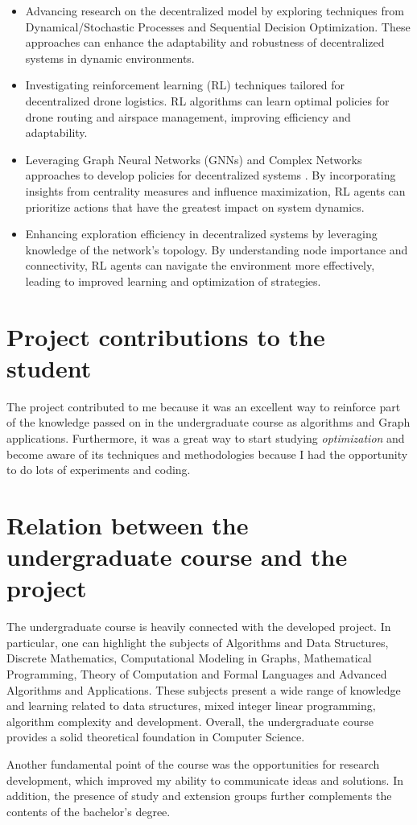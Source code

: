 \begin{itemize}
    \item Advancing research on the decentralized model by exploring techniques from Dynamical/Stochastic Processes and Sequential Decision Optimization. These approaches can enhance the adaptability and robustness of decentralized systems in dynamic environments.
    \item Investigating reinforcement learning (RL) techniques tailored for decentralized drone logistics. RL algorithms can learn optimal policies for drone routing and airspace management, improving efficiency and adaptability.
    \item Leveraging Graph Neural Networks (GNNs) and Complex Networks approaches to develop policies for decentralized systems \cite{gnn_policyXIAO2023119074}. By incorporating insights from centrality measures and influence maximization, RL agents can prioritize actions that have the greatest impact on system dynamics.
    \item Enhancing exploration efficiency in decentralized systems by leveraging knowledge of the network's topology. By understanding node importance and connectivity, RL agents can navigate the environment more effectively, leading to improved learning and optimization of strategies.
\end{itemize}

\section{Project contributions to the student}

The project contributed to me because it was an excellent way to reinforce part of the knowledge passed on in the undergraduate course as algorithms and Graph applications. Furthermore, it was a great way to start studying \emph{optimization} and become aware of its techniques and methodologies because I had the opportunity to do lots of experiments and coding.

\section{Relation between the undergraduate course and the project}

The undergraduate course is heavily connected with the developed project. In particular, one can highlight the subjects of Algorithms and Data Structures, Discrete Mathematics, Computational Modeling in Graphs, Mathematical Programming, Theory of Computation and Formal Languages and Advanced Algorithms and Applications. These subjects present a wide range of knowledge and learning related to data structures, mixed integer linear programming, algorithm complexity and development. Overall, the undergraduate course provides a solid theoretical foundation in Computer Science.

Another fundamental point of the course was the opportunities for research development, which improved my ability to communicate ideas and solutions. In addition, the presence of study and extension groups further complements the contents of the bachelor's degree.

